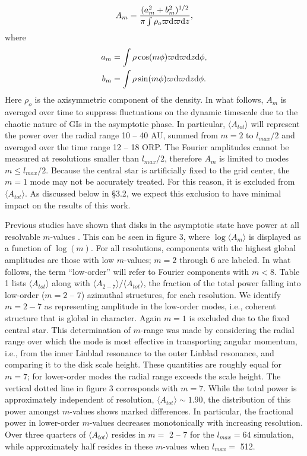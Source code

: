 \documentclass[manuscript]{aastex}
\begin{document}
\begin{equation}
A_m = \frac{(a_m^2 + b_m^2)^{1/2}}{\pi\int\rho_o \varpi {\rm d}\varpi {\rm d}z},
\end{equation}
where
\begin{subequations}
\begin{align}
a_m &= \int \rho \cos(m\phi)\varpi {\rm d}\varpi {\rm d}z {\rm d}\phi,\\
b_m &=\int \rho \sin(m\phi)\varpi {\rm d}\varpi {\rm d}z {\rm d}\phi.
\end{align}
\end{subequations}
Here  $\rho_o$ is the axisymmetric component of the density. In what follows, $A_m$ is averaged over time to suppress fluctuations on the dynamic timescale due to the chaotic nature of GIs in the asymptotic  phase.
In particular, $\langle A_{tot} \rangle$ will represent the power over the radial range 10 -- 40 AU, summed from $ m = 2$ to $l_{max}/2$ and averaged over the time range 12 -- 18 ORP. The Fourier amplitudes cannot be measured at resolutions smaller than $l_{max}/2$, therefore $A_m$ is limited to modes $m \le l_{max}/2$.  
Because the central star is artificially fixed to the grid center, the $m=1$ mode may not
be accurately treated. For this reason, it is excluded from $\langle A_{tot} \rangle$.  As discussed below in \S3.2,
we expect this exclusion to have minimal impact on the results of this work.


Previous studies have shown that disks in the asymptotic state have power at all resolvable $m$-values  \citep
{lodato2004,mejia2005,boley2006,cossins2009}.  This can be seen in
figure 3, where $\log \langle A_m\rangle$ is displayed as a function of $\log(m)$.  For all resolutions, components with the highest global amplitudes are those with low $m$-values; $m=2$ through 6 are labeled.  
In what follows, the term ``low-order''  will refer to Fourier components with $m <  8$.
Table 1 lists $\langle A_{tot} \rangle$ along with $\langle A_{2-7} 
\rangle  /  \langle A_{tot} \rangle$,  the fraction of the total power falling into low-order ($m = 2$ -- 7) azimuthal structures, 
for each resolution. 
We identify $m=2-7$ as representing amplitude in the low-order modes, i.e., coherent structure that is
global in character.   Again 
$m=1$ is excluded due to the fixed central star. This determination of $m$-range
was made by considering the radial range over 
which the mode is most effective in transporting angular momentum, i.e., from the inner Linblad resonance to the outer 
Linblad resonance, and comparing it to the disk scale height. These quantities are roughly equal for $m=7$; for 
lower-order modes the radial range exceeds the scale height. The vertical dotted line in figure 3 corresponds with $m=7$. 
While the total power is approximately independent of resolution, $\langle A_{tot} \rangle \sim 1.90$, 
the distribution of this power amongst $m$-values
shows marked differences. In particular, the fractional power in lower-order $m$-values decreases monotonically with increasing resolution.  Over three quarters of $\langle A_{tot} \rangle$ resides
in $m =$ 2 -- 7 for the $l_{max} = 64$ simulation, while approximately half resides in these $m$-values when $l_{max} =$ 512.
\end{document}
